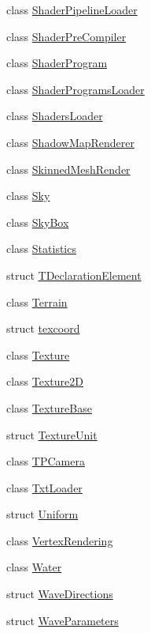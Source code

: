 \begin{DoxyCompactItemize}
class \hyperlink{class_agmd_1_1_shader_pipeline_loader}{Shader\+Pipeline\+Loader}
\item 
class \hyperlink{class_agmd_1_1_shader_pre_compiler}{Shader\+Pre\+Compiler}
\item 
class \hyperlink{class_agmd_1_1_shader_program}{Shader\+Program}
\item 
class \hyperlink{class_agmd_1_1_shader_programs_loader}{Shader\+Programs\+Loader}
\item 
class \hyperlink{class_agmd_1_1_shaders_loader}{Shaders\+Loader}
\item 
class \hyperlink{class_agmd_1_1_shadow_map_renderer}{Shadow\+Map\+Renderer}
\item 
class \hyperlink{class_agmd_1_1_skinned_mesh_render}{Skinned\+Mesh\+Render}
\item 
class \hyperlink{class_agmd_1_1_sky}{Sky}
\item 
class \hyperlink{class_agmd_1_1_sky_box}{Sky\+Box}
\item 
class \hyperlink{class_agmd_1_1_statistics}{Statistics}
\item 
struct \hyperlink{struct_agmd_1_1_t_declaration_element}{T\+Declaration\+Element}
\item 
class \hyperlink{class_agmd_1_1_terrain}{Terrain}
\item 
struct \hyperlink{struct_agmd_1_1texcoord}{texcoord}
\item 
class \hyperlink{class_agmd_1_1_texture}{Texture}
\item 
class \hyperlink{class_agmd_1_1_texture2_d}{Texture2\+D}
\item 
class \hyperlink{class_agmd_1_1_texture_base}{Texture\+Base}
\item 
struct \hyperlink{struct_agmd_1_1_texture_unit}{Texture\+Unit}
\item 
class \hyperlink{class_agmd_1_1_t_p_camera}{T\+P\+Camera}
\item 
class \hyperlink{class_agmd_1_1_txt_loader}{Txt\+Loader}
\item 
struct \hyperlink{struct_agmd_1_1_uniform}{Uniform}
\item 
class \hyperlink{class_agmd_1_1_vertex_rendering}{Vertex\+Rendering}
\item 
class \hyperlink{class_agmd_1_1_water}{Water}
\item 
struct \hyperlink{struct_agmd_1_1_wave_directions}{Wave\+Directions}
\item 
struct \hyperlink{struct_agmd_1_1_wave_parameters}{Wave\+Parameters}
\end{DoxyCompactItemize}
